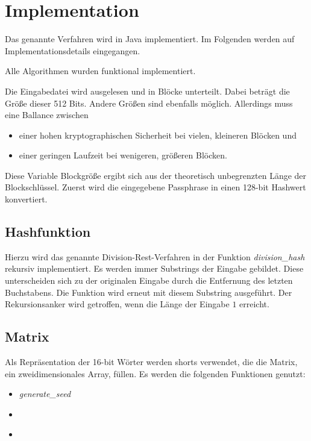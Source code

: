 \documentclass[10pt,a4paper]{article}
\begin{document}
\section{Implementation}

Das genannte Verfahren wird in Java implementiert.
Im Folgenden werden auf Implementationsdetails eingegangen.

Alle Algorithmen wurden funktional implementiert.

Die Eingabedatei wird ausgelesen und in Blöcke unterteilt.
Dabei beträgt die Größe dieser 512 Bits.
Andere Größen sind ebenfalls möglich.
Allerdings muss eine Ballance zwischen
\begin{itemize}
    \item einer hohen kryptographischen Sicherheit bei vielen, kleineren Blöcken und
    \item einer geringen Laufzeit bei wenigeren, größeren Blöcken.
\end{itemize}

Diese Variable Blockgröße ergibt sich aus der theoretisch unbegrenzten Länge der Blockschlüssel.
Zuerst wird die eingegebene Passphrase in einen 128-bit Hashwert konvertiert.

\subsection{Hashfunktion}

Hierzu wird das genannte Division-Rest-Verfahren in der Funktion \textit{division\_hash} rekursiv implementiert.
Es werden immer Substrings der Eingabe gebildet.
Diese unterscheiden sich zu der originalen Eingabe durch die Entfernung des letzten Buchstabens.
Die Funktion wird erneut mit diesem Substring ausgeführt.
Der Rekursionsanker wird getroffen, wenn die Länge der Eingabe $1$ erreicht.

\subsection{Matrix}

Als Repräsentation der 16-bit Wörter werden shorts verwendet, die die Matrix, ein zweidimensionales Array, füllen.
Es werden die folgenden Funktionen genutzt:
\begin{itemize}
    \item \textit{generate\_seed}
    \item \textit{}
    \item \textit{}
\end{itemize}
\end{document}
